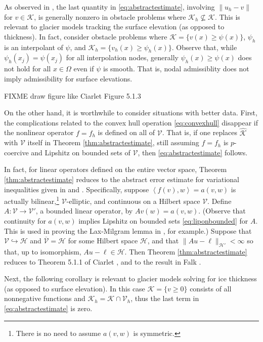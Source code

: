 \documentclass[hidelinks,onefignum,onetabnum,final]{siamart220329}  %
\newcommand{\cH}{\mathcal{H}}
\newcommand{\cK}{\mathcal{K}}
\newcommand{\cV}{\mathcal{V}}
\newcommand{\hcK}{\widehat{\cK}}
\newcommand{\ip}[2]{\left<#1,#2\right>}
\begin{document}
As observed in \cite{Ciarlet2002}, the last quantity in \eqref{eq:abstractestimate}, involving $\|u_h-v\|$ for $v\in\cK$, is generally nonzero in obstacle problems where $\cK_h \nsubseteq \cK$.  This is relevant to glacier models tracking the surface elevation (as opposed to thickness).  In fact, consider obstacle problems where $\cK=\{v(x)\ge \psi(x)\}$, $\psi_h$ is an interpolant of $\psi$, and $\cK_h=\{v_h(x)\ge \psi_h(x)\}$.  Observe that, while $\psi_h(x_j)=\psi(x_j)$ for all interpolation nodes, generally $\psi_h(x) \ge \psi(x)$ does not hold for all $x\in\Omega$ even if $\psi$ is smooth.  That is, nodal admissiblity does not imply admissibility for surface elevations.

FIXME draw figure like Ciarlet Figure 5.1.3

On the other hand, it is worthwhile to consider situations with better data.  First, the complications related to the convex hull operation \eqref{eq:convexhull} disappear if the nonlinear operator $f=f_h$ is defined on all of $\cV$.  That is, if one replaces $\hcK$ with $\cV$ itself in Theorem \ref{thm:abstractestimate}, still assuming $f=f_h$ is $p$-coercive and Lipshitz on bounded sets of $\cV$, then \eqref{eq:abstractestimate} follows.

In fact, for linear operators defined on the entire vector space, Theorem \eqref{thm:abstractestimate} reduces to the abstract error estimate for variational inequalities given in \cite{Ciarlet2002} and \cite{Falk1974}.  Specifically, suppose $\ip{f(v)}{w}=a(v,w)$ is actually bilinear,\footnote{There is no need to assume $a(v,w)$ is symmetric.} $\cV$-elliptic, and continuous on a Hilbert space $\cV$.  Define $A:\cV\to\cV'$, a bounded linear operator, by $Av(w) = a(v,w)$. (Observe that continuity for $a(v,w)$ implies Lipshitz on bounded sets \eqref{eq:liponbounded} for $A$.  This is used in proving the Lax-Milgram lemma in \cite{Ciarlet2002}, for example.)  Suppose that $\cV\hookrightarrow \cH$ and $\overline{\cV} = \cH$ for some Hilbert space $\cH$, and that $\|Au-\ell\|_{\cH'} < \infty$ so that, up to isomorphism, $Au-\ell \in\cH$.  Then Theorem \ref{thm:abstractestimate} reduces to Theorem 5.1.1 of Ciarlet \cite{Ciarlet2002}, and to the result in Falk \cite{Falk1974}.

Next, the following corollary is relevant to glacier models solving for ice thickness (as opposed to surface elevation).  In this case $\cK = \{v\ge 0\}$ consists of all nonnegative functions and $\cK_h=\cK\cap\cV_h$, thus the last term in \eqref{eq:abstractestimate} is zero.
\end{document}
